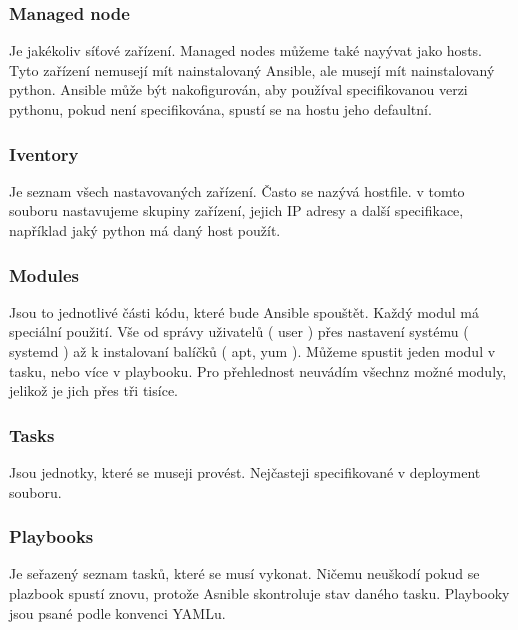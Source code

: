 \subsubsection{Managed node}

Je jakékoliv síťové zařízení. Managed nodes můžeme také nayývat jako hosts. Tyto zařízení nemusejí mít nainstalovaný Ansible, ale musejí mít nainstalovaný python. Ansible může být nakofigurován, aby používal specifikovanou verzi pythonu, pokud není specifikována, spustí se na hostu jeho defaultní.

\subsubsection{Iventory}

Je seznam všech nastavovaných zařízení. Často se nazývá hostfile. v tomto souboru nastavujeme skupiny zařízení, jejich IP adresy a další specifikace, například jaký python má daný host použít. 

\subsubsection{Modules}

Jsou to jednotlivé části kódu, které bude Ansible spouštět. Každý modul má speciální použití. Vše od správy uživatelů ( user ) přes nastavení systému ( systemd ) až k instalovaní balíčků ( apt, yum ). Můžeme spustit jeden modul v tasku, nebo více v playbooku. Pro přehlednost neuvádím všechnz možné moduly, jelikož je jich přes tři tisíce. 

\subsubsection{Tasks}

Jsou jednotky, které se museji provést. Nejčasteji specifikované v deployment souboru. 

\subsubsection{Playbooks}

Je seřazený seznam tasků, které se musí vykonat. Ničemu neuškodí pokud se plazbook spustí znovu, protože Asnible skontroluje stav daného tasku. Playbooky jsou psané podle konvenci YAMLu. 
